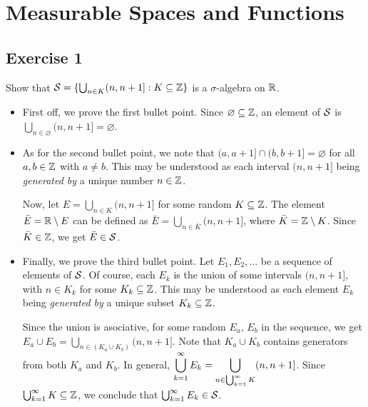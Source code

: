 \section{Measurable Spaces and Functions}

\subsection{Exercise 1}

\begin{formulationBox}
	Show that $\mathcal{S} = \{\bigcup_{n\in K}(n, n+1]:K\subseteq\mathbb{Z}\}$ is a $\sigma$-algebra on $\mathbb{R}$.
\end{formulationBox}

\begin{itemize}
	\item First off, we prove the first bullet point. Since $\varnothing\subseteq\mathbb{Z}$, an element of $\mathcal{S}$ is $\bigcup_{n\in\varnothing}(n, n+1] = \varnothing$.
	
	\item As for the second bullet point, we note that $(a, a+1]\cap(b, b+1] = \varnothing$ for all $a,b\in\mathbb{Z}$ with $a\neq b$. This may be understood as each interval $(n, n+1]$ being \textit{generated by} a unique number $n\in\mathbb{Z}$.
	
	Now, let $E = \bigcup_{n\in K}(n, n+1]$ for some random $K\subseteq\mathbb{Z}$. The element $\bar{E} = \mathbb{R}\setminus E$ can be defined as $\bar{E} = \bigcup_{n\in \bar{K}}(n, n+1]$, where $\bar{K} = \mathbb{Z}\setminus K$. Since $\bar{K}\in\mathbb{Z}$, we get $\bar{E}\in\mathcal{S}$.
	
	\item Finally, we prove the third bullet point. Let $E_1, E_2, ...$ be a sequence of elements of $\mathcal{S}$. Of course, each $E_k$ is the union of some intervals $(n, n+1]$, with $n\in K_k$ for some $K_k\subseteq\mathbb{Z}$. This may be understood as each element $E_k$ being \textit{generated by} a unique subset $K_k\subseteq\mathbb{Z}$.
	
	Since the union is asociative, for some random $E_a$, $E_b$ in the sequence, we get $E_a\cup E_b = \bigcup_{n\in(K_a\cup K_b)}(n, n+1]$. Note that $K_a\cup K_b$ contains generators from both $K_a$ and $K_b$. In general, $\displaystyle \bigcup_{k=1}^{\infty}E_k = \bigcup_{n\in\bigcup_{k=1}^{\infty}K}(n, n+1]$. Since $\bigcup_{k=1}^{\infty}K \subseteq \mathbb{Z}$, we conclude that $\bigcup_{k=1}^{\infty}E_k \in \mathcal{S}$.
\end{itemize}


